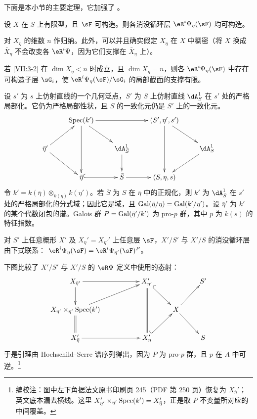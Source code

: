 下面是本小节的主要定理，它加强了 \cite[XIII 2.3.1, 2.4.2]{sga7}。

\begin{theorem_}\label{VII:3-2}
设 $X$ 在 $S$ 上有限型，且 $\sF$ 可构造。则各消没循环层 $\eR^i \Psi_\eta(\sF)$ 均可构造。
\end{theorem_}

对 $X_\eta$ 的维数 $n$ 作归纳。此外，可以并且确实假定 $X_\eta$ 在 $X$ 中稠密（将 $X$ 换成 $\bar X_\eta$ 不会改变各 $\eR^i \Psi$，因为它们支撑在 $\bar X_\eta$ 上）。

\begin{lemma_}\label{VII:3-3}
若 \ref{VII:3-2} 在 $\dim X_\eta<n$ 时成立，且 $\dim X_\eta=n$，则各 $\eR^i \Psi_\eta(\sF)$ 中存在可构造子层 $\sG_i$，使 $\eR^i\Psi_\eta(\sF)/\sG_i$ 的局部截面的支撑有限。
\end{lemma_}

设 $s'$ 为 $s$ 上仿射直线的一个几何泛点，$S'$ 为 $S$ 上仿射直线 $\dA_S^1$ 在 $s'$ 处的严格局部化。它仍为严格局部性状，且 $S$ 的一致化元仍是 $S'$ 上的一致化元。
\[\xymatrix{
  & \spec(k') \ar[rr] \ar[dd] \ar[dr]
    & & (S',\eta',s') \ar[dr] \ar[dd] \\
  \bar\eta' \ar[ur] \ar[dr]
    & & \dA_{\bar S}^1 \ar[d]
    & & \dA_S^1 \ar[dl] \\
  & \bar\eta\ar@{^{(}->}[r]
    & \bar S \ar[r]
    & (S,\eta,s)
}\]
令 $k'=k(\bar\eta)\otimes_{k(\eta)}k(\eta')$。若 $\bar S$ 为 $S$ 在 $\bar\eta$ 中的正规化，则 $k'$ 为 $\dA_{\bar S}^1$ 在 $s'$ 处的严格局部化的分式域；因此它是域，且 $\operatorname{Gal}(\bar\eta/\eta)=\operatorname{Gal}(k'/\eta')$。设 $\bar\eta'$ 为 $k'$ 的某个代数闭包的谱。Galois 群 $P=\operatorname{Gal}(\bar\eta'/k')$ 为 pro-$p$ 群，其中 $p$ 为 $k(s)$ 的特征指数。

\begin{lemma_}\label{VII:3-4}
对 $S'$ 上任意概形 $X'$ 及 $X_\eta'=X_{\eta'}'$ 上任意层 $\sF$，$X'/S'$ 与 $X'/S$ 的消没循环层由下式联系：
$\eR^i \Psi_\eta(\sF) =\eR^i\Psi_{\eta'}(\sF)^P$。
\end{lemma_}

下图比较了 $X'/S'$ 与 $X'/S$ 的 $\eR\Psi$ 定义中使用的态射：
\[\xymatrix{
  X_{\bar\eta'} \ar[rr] \ar[d]
    & & X_{\eta'}' \ar@{=}[dd] \ar@{^{(}->}[dr]
    & & S' \\
  X_{\eta'}\times_{\eta'}\spec(k') \ar@{=}[d] \ar[urr]
    & & & X \ar[ur] \ar[dr] \\
  X_{\bar\eta}' \ar[rr]
    & & X_\eta' \ar@{^{(}->}[ur]
    & & S
}\]
于是引理由 Hochschild--Serre 谱序列得出，因为 $P$ 为 pro-$p$ 群，且 $p$ 在 $A$ 中可逆。\footnote{编校注：图中左下角据法文原书印刷页 245（PDF 第 250 页）恢复为 $X_{\bar\eta}'$；英文底本漏去横线。这里 $X_{\eta'}'\times_{\eta'}\operatorname{Spec}(k')=X_{\bar\eta}'$，正是取 $P$ 不变量所对应的中间覆盖。}

